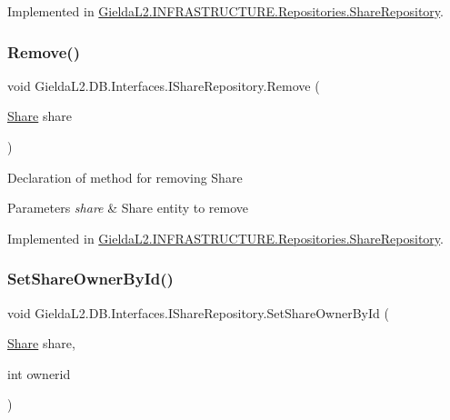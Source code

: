 Implemented in \mbox{\hyperlink{class_gielda_l2_1_1_i_n_f_r_a_s_t_r_u_c_t_u_r_e_1_1_repositories_1_1_share_repository_ac034dd25c3630f8641baf9e7eafe94db}{Gielda\+L2.\+I\+N\+F\+R\+A\+S\+T\+R\+U\+C\+T\+U\+R\+E.\+Repositories.\+Share\+Repository}}.

\mbox{\label{interface_gielda_l2_1_1_d_b_1_1_interfaces_1_1_i_share_repository_a270dc411526d961bac26e1df19ae2563}} 
\subsubsection{\texorpdfstring{Remove()}{Remove()}}
{\footnotesize\ttfamily void Gielda\+L2.\+D\+B.\+Interfaces.\+I\+Share\+Repository.\+Remove (\begin{DoxyParamCaption}\item[{\mbox{\hyperlink{class_gielda_l2_1_1_d_b_1_1_entities_1_1_share}{Share}}}]{share }\end{DoxyParamCaption})}



Declaration of method for removing Share 


\begin{DoxyParams}{Parameters}
{\em share} & Share entity to remove\\
\hline
\end{DoxyParams}


Implemented in \mbox{\hyperlink{class_gielda_l2_1_1_i_n_f_r_a_s_t_r_u_c_t_u_r_e_1_1_repositories_1_1_share_repository_a76ee0cf8f78b19983167a3bcdff4e405}{Gielda\+L2.\+I\+N\+F\+R\+A\+S\+T\+R\+U\+C\+T\+U\+R\+E.\+Repositories.\+Share\+Repository}}.

\mbox{\label{interface_gielda_l2_1_1_d_b_1_1_interfaces_1_1_i_share_repository_a9670fbeb44bb7ac102fdff4b6a38e24f}} 
\subsubsection{\texorpdfstring{SetShareOwnerById()}{SetShareOwnerById()}}
{\footnotesize\ttfamily void Gielda\+L2.\+D\+B.\+Interfaces.\+I\+Share\+Repository.\+Set\+Share\+Owner\+By\+Id (\begin{DoxyParamCaption}\item[{\mbox{\hyperlink{class_gielda_l2_1_1_d_b_1_1_entities_1_1_share}{Share}}}]{share,  }\item[{int}]{ownerid }\end{DoxyParamCaption})}



